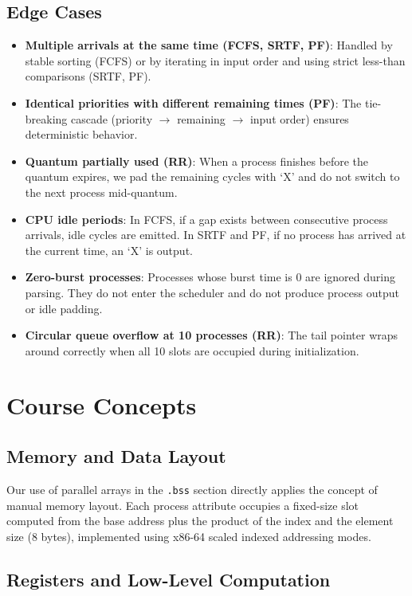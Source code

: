 \documentclass[a4paper,12pt]{article}
\begin{document}
\subsection{Edge Cases}

\begin{itemize}
    \item \textbf{Multiple arrivals at the same time (FCFS, SRTF, PF)}: Handled by stable sorting (FCFS) or by iterating in input order and using strict less-than comparisons (SRTF, PF).
    \item \textbf{Identical priorities with different remaining times (PF)}: The tie-breaking cascade (priority $\rightarrow$ remaining $\rightarrow$ input order) ensures deterministic behavior.
    \item \textbf{Quantum partially used (RR)}: When a process finishes before the quantum expires, we pad the remaining cycles with `X' and do not switch to the next process mid-quantum.
    \item \textbf{CPU idle periods}: In FCFS, if a gap exists between consecutive process arrivals, idle cycles are emitted. In SRTF and PF, if no process has arrived at the current time, an `X' is output.
    \item \textbf{Zero-burst processes}: Processes whose burst time is 0 are ignored during parsing. They do not enter the scheduler and do not produce process output or idle padding.
    \item \textbf{Circular queue overflow at 10 processes (RR)}: The tail pointer wraps around correctly when all 10 slots are occupied during initialization.
\end{itemize}


\section{Course Concepts}

\subsection{Memory and Data Layout}

Our use of parallel arrays in the \texttt{.bss} section directly applies the concept of manual memory layout. Each process attribute occupies a fixed-size slot computed from the base address plus the product of the index and the element size (8 bytes), implemented using x86-64 scaled indexed addressing modes.

\subsection{Registers and Low-Level Computation}
\end{document}
